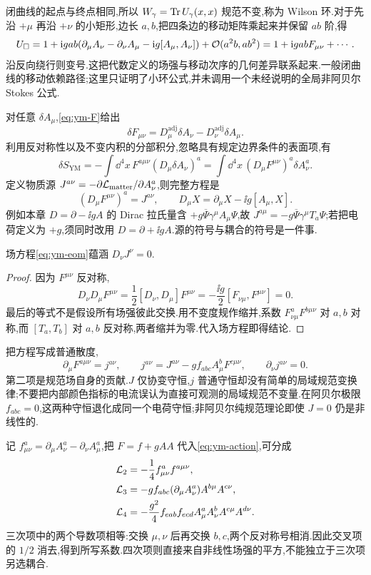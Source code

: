 闭曲线的起点与终点相同,所以 $W_\gamma=\operatorname{Tr} U_\gamma(x,x)$ 规范不变,称为 Wilson 环.对于先沿 $+\mu$ 再沿 $+\nu$ 的小矩形,边长 $a,b$,把四条边的移动矩阵乘起来并保留 $ab$ 阶,得
\[
 U_\square=1+\mathrm i gab(\partial_\mu A_\nu-\partial_\nu A_\mu-\mathrm i g[A_\mu,A_\nu])+\mathcal O(a^2b,ab^2)
 =1+\mathrm i gabF_{\mu\nu}+\cdots.
\]
沿反向绕行则变号.这把代数定义的场强与移动次序的几何差异联系起来.一般闭曲线的移动依赖路径;这里只证明了小环公式,并未调用一个未经说明的全局非阿贝尔 Stokes 公式.

对任意 $\delta A_\mu$,\eqref{eq:ym-F}给出
\[
 \delta F_{\mu\nu}=D_\mu^{\mathrm{adj}}\delta A_\nu-D_\nu^{\mathrm{adj}}\delta A_\mu.
\]
利用反对称性以及不变内积的分部积分,忽略具有规定边界条件的表面项,有
\[
 \delta S_{\mathrm{YM}}=-\int\dd^4x\,F^{a\mu\nu}(D_\mu\delta A_\nu)^a
 =\int\dd^4x\,(D_\mu F^{\mu\nu})^a\delta A_\nu^a.
\]
定义物质源 $J^{a\nu}=-\partial\mathcal L_{\mathrm{matter}}/\partial A_\nu^a$,则完整方程是
\begin{equation}\label{eq:ym-eom}
 (D_\mu F^{\mu\nu})^a=J^{a\nu},\qquad
 D_\mu X=\partial_\mu X-\ii g[A_\mu,X].
\end{equation}
例如本章 $D=\partial-\ii gA$ 的 Dirac 拉氏量含 $+g\overline\Psi\gamma^\mu A_\mu\Psi$,故 $J^{a\mu}=-g\overline\Psi\gamma^\mu T_a\Psi$;若把电荷定义为 $+g$,须同时改用 $D=\partial+\ii gA$.源的符号与耦合的符号是一件事.

\begin{proposition}[协变守恒]
场方程\eqref{eq:ym-eom}蕴涵 $D_\nu J^\nu=0$.
\end{proposition}
\begin{proof}
因为 $F^{\mu\nu}$ 反对称,
\[
 D_\nu D_\mu F^{\mu\nu}=\frac12[D_\nu,D_\mu]F^{\mu\nu}
 =-\frac{\ii g}{2}[F_{\nu\mu},F^{\mu\nu}]=0.
\]
最后的等式不是假设所有场强彼此交换.用不变度规作缩并,系数 $F_{\nu\mu}^aF^{b\mu\nu}$ 对 $a,b$ 对称,而 $[T_a,T_b]$ 对 $a,b$ 反对称,两者缩并为零.代入场方程即得结论.
\end{proof}

把方程写成普通散度,
\[
 \partial_\mu F^{a\mu\nu}=j^{a\nu},\qquad
 j^{a\nu}=J^{a\nu}-gf_{abc}A_\mu^bF^{c\mu\nu},\qquad
 \partial_\nu j^{a\nu}=0.
\]
第二项是规范场自身的贡献.$J$ 仅协变守恒,$j$ 普通守恒却没有简单的局域规范变换律;不要把内部颜色指标的电流误认为直接可观测的局域规范不变量.在阿贝尔极限 $f_{abc}=0$,这两种守恒退化成同一个电荷守恒;非阿贝尔纯规范理论即使 $J=0$ 仍是非线性的.

记 $f_{\mu\nu}^a=\partial_\mu A_\nu^a-\partial_\nu A_\mu^a$,把 $F=f+gAA$ 代入\eqref{eq:ym-action},可分成
\begin{align}\label{eq:ym-cubic-quartic}
 \mathcal L_2&=-\frac14f_{\mu\nu}^af^{a\mu\nu},\notag\\
 \mathcal L_3&=-gf_{abc}(\partial_\mu A_\nu^a)A^{b\mu}A^{c\nu},\\
 \mathcal L_4&=-\frac{g^2}{4}f_{eab}f_{ecd}A_\mu^aA_\nu^bA^{c\mu}A^{d\nu}.\notag
\end{align}
三次项中的两个导数项相等:交换 $\mu,\nu$ 后再交换 $b,c$,两个反对称号相消.因此交叉项的 $1/2$ 消去,得到所写系数.四次项则直接来自非线性场强的平方,不能独立于三次项另选耦合.

